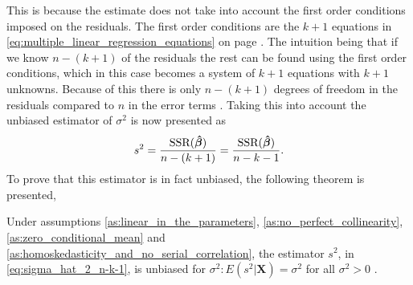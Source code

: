 This is because the estimate does not take into account the first order conditions imposed on the residuals.
The first order conditions are the $k + 1$ equations in \eqref{eq:multiple_linear_regression_equations} on page \pageref{eq:multiple_linear_regression_equations}.
The intuition being that if we know $n - (k + 1)$ of the residuals the rest can be found using the first order conditions, which in this case becomes a system of $k + 1$ equations with $k + 1$ unknowns. 
Because of this there is only $n - (k + 1)$ degrees of freedom in the residuals compared to $n$ in the error terms \cite[p. 55]{Wooldridge2012}.
Taking this into account the unbiased estimator of $\sigma^2$ is now presented as
\begin{align} \label{eq:sigma_hat_2_n-k-1}
    s^2 = \frac{\operatorname{\text{SSR}}(\operatorname{\boldsymbol{\hat{\beta}}})}{n - (k + 1)} = \frac{\operatorname{\text{SSR}}(\operatorname{\boldsymbol{\hat{\beta}}})}{n - k - 1}.
\end{align}
To prove that this estimator is in fact unbiased, the following theorem is presented,
\begin{theorem}
    Under assumptions \ref{as:linear_in_the_parameters}, \ref{as:no_perfect_collinearity}, \ref{as:zero_conditional_mean} and \ref{as:homoskedasticity_and_no_serial_correlation}, the estimator $s^2$, in \eqref{eq:sigma_hat_2_n-k-1}, is unbiased for $\sigma^2:E(s^2|\mathbf{X}) = \sigma^2$ for all $\sigma^2 > 0$ \cite[p. 813]{Wooldridge2012}.
\end{theorem}

